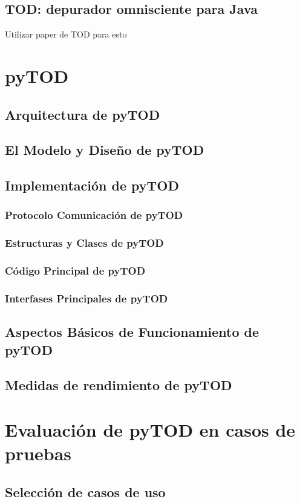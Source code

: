 \documentclass[12pt,a4paper]{report}
\begin{document}
	\section{TOD: depurador omnisciente para Java}

Utilizar paper de TOD para esto

\chapter{pyTOD}
	\section{Arquitectura de pyTOD}
	\section{El Modelo y Diseño de pyTOD}
	\section{Implementación de pyTOD}
		\subsection{Protocolo Comunicación de pyTOD}
		\subsection{Estructuras y Clases de pyTOD}
		\subsection{Código Principal de pyTOD}
		\subsection{Interfases Principales de pyTOD}
	\section{Aspectos Básicos de Funcionamiento de pyTOD}
	\section{Medidas de rendimiento de pyTOD}
\chapter{Evaluación de pyTOD en casos de pruebas}
	\section{Selección de casos de uso}
\end{document}
